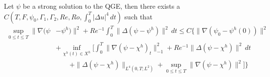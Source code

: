 \begin{thm} \label{thm:StrongConvergence}
  Let $\psi$ be a strong solution to the QGE, then there exists a \\ $C(T, F,
  \psi_0, \Gamma_1, \Gamma_2, Re, Ro,\int_0^T\! |\Delta u|^4\, dt)$ such that
  \begin{equation}
    \begin{split}
      \sup_{0\le t \le T} \|\nabla (\psi &- \psi^h) \|^2 + Re^{-1}
        \int_{0}^{T}\! \|\Delta (\psi - \psi^h)\|^2 \, dt \le C\biggl\{
          \|\nabla(\psi_0 - \psi^h(0))\|^2 \\
        & + \inf_{\chi^h(t) \in X^h} \biggl[
          \int_0^T\! \|\nabla(\psi - \chi^h)_t\|^2_{-1}
          + Re^{-1} \|\Delta(\psi - \chi^h)\|^2\, dt \\
        & \qquad + \|\Delta(\psi - \chi^h)\|_{L^4(0,T;L^2)} + \sup_{0 \le t \le T}
          \|\nabla (\psi - \chi^h)\|^2\biggr] \biggr\}
    \end{split}
    \label{eqn:StrongConvergence}
  \end{equation}

\end{thm}
